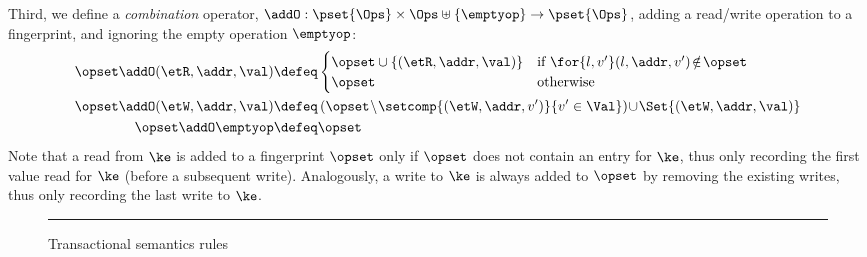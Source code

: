 Third, we define a \emph{combination} operator,
$\addO  : \pset{\Ops} \times \Ops \uplus \{\emptyop\} \rightarrow \pset{\Ops}$, 
adding a read/write operation to a fingerprint, and ignoring the empty operation $\emptyop$: 
\begin{align*}
    \opset \addO (\etR, \addr, \val)  
    & \defeq
    \begin{cases}
        \opset \cup \{(\etR, \addr, \val)\} & \text{if } \for{l, v'} (l, \addr, v') \! \notin \! \opset \\
        \opset &  \text{otherwise} \\
    \end{cases}  \\
    \opset \addO (\etW, \addr, \val) 
    & \defeq 
    \left( \opset \! \setminus \! \setcomp{(\etW, \addr, v')}{v' \in \Val} \right)  \!
    \cup \! \Set{(\etW, \addr, \val)} \\
    \opset \addO \emptyop  & \defeq \opset 
\end{align*}
Note that a read from $\ke$ is added to a fingerprint $\opset$ only if $\opset$ does not contain an entry for $\ke$, thus only recording the first value read for $\ke$ (before a subsequent write). 
Analogously, a write to $\ke$ is always added to $\opset$ by removing the existing writes, thus only recording the last write to $\ke$. 

%
\begin{figure*}[!t]
{}
\hrule\vspace{5pt}
\caption{Transactional semantics rules}
\label{fig:semantics-trans}
\vspace*{-10pt}
\end{figure*}


